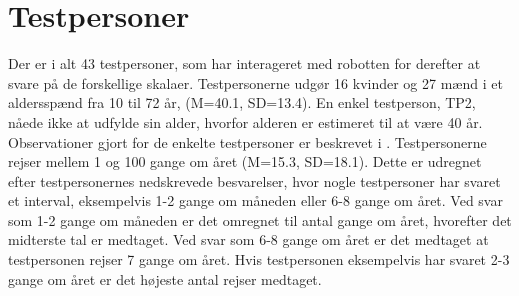 \section{Testpersoner}
\label{ParametreFaktiskeTestpersoner}
%
Der er i alt 43 testpersoner, som har interageret med robotten for derefter at svare på de forskellige skalaer. Testpersonerne udgør 16 kvinder og 27 mænd i et aldersspænd fra 10 til 72 år, (M=40.1, SD=13.4). En enkel testperson, TP2, nåede ikke at udfylde sin alder, hvorfor alderen er estimeret til at være 40 år. Observationer gjort for de enkelte testpersoner er beskrevet i . Testpersonerne rejser mellem 1 og 100 gange om året (M=15.3, SD=18.1). Dette er udregnet efter testpersonernes nedskrevede besvarelser, hvor nogle testpersoner har svaret et interval, eksempelvis 1-2 gange om måneden eller 6-8 gange om året. Ved svar som 1-2 gange om måneden er det omregnet til antal gange om året, hvorefter det midterste tal er medtaget. Ved svar som 6-8 gange om året er det medtaget at testpersonen rejser 7 gange om året. Hvis testpersonen eksempelvis har svaret 2-3 gange om året er det højeste antal rejser medtaget.
%
